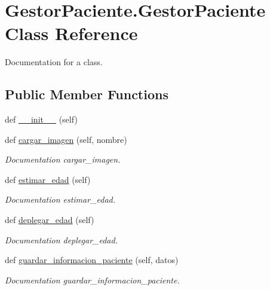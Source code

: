 \hypertarget{class_gestor_paciente_1_1_gestor_paciente}{}\section{Gestor\+Paciente.\+Gestor\+Paciente Class Reference}
\label{class_gestor_paciente_1_1_gestor_paciente}


Documentation for a class.  


\subsection*{Public Member Functions}
\begin{DoxyCompactItemize}
\item 
def \mbox{\hyperlink{class_gestor_paciente_1_1_gestor_paciente_a2950c017c2b347572c1fb0d203c3d995}{\+\_\+\+\_\+init\+\_\+\+\_\+}} (self)
\item 
def \mbox{\hyperlink{class_gestor_paciente_1_1_gestor_paciente_a67e9a245c2ce693274b26295f9fdfd46}{cargar\+\_\+imagen}} (self, nombre)
\begin{DoxyCompactList}\small\item\em Documentation cargar\+\_\+imagen. \end{DoxyCompactList}\item 
def \mbox{\hyperlink{class_gestor_paciente_1_1_gestor_paciente_ae1b7d499286433f0b1af88907fde7115}{estimar\+\_\+edad}} (self)
\begin{DoxyCompactList}\small\item\em Documentation estimar\+\_\+edad. \end{DoxyCompactList}\item 
def \mbox{\hyperlink{class_gestor_paciente_1_1_gestor_paciente_a2b0aa34c8b8369a735086f1ddc6e2e54}{deplegar\+\_\+edad}} (self)
\begin{DoxyCompactList}\small\item\em Documentation deplegar\+\_\+edad. \end{DoxyCompactList}\item 
def \mbox{\hyperlink{class_gestor_paciente_1_1_gestor_paciente_aa67ac548d627bedc213c3eb39b051bb9}{guardar\+\_\+informacion\+\_\+paciente}} (self, datos)
\begin{DoxyCompactList}\small\item\em Documentation guardar\+\_\+informacion\+\_\+paciente. \end{DoxyCompactList}\end{DoxyCompactItemize}
